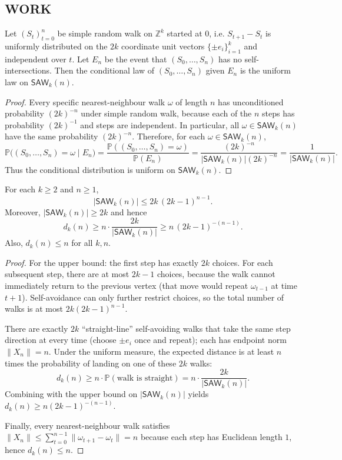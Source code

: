 \subsection*{WORK}
\begin{lemma}\label{lem:529-uniform}
Let $(S_t)_{t=0}^n$ be simple random walk on $\mathbb Z^k$ started at $0$, i.e. $S_{t+1}-S_t$ is uniformly distributed on the $2k$ coordinate unit vectors $\{\pm e_i\}_{i=1}^k$ and independent over $t$. Let $E_n$ be the event that $(S_0,\dots,S_n)$ has no self-intersections. Then the conditional law of $(S_0,\dots,S_n)$ given $E_n$ is the uniform law on $\mathsf{SAW}_k(n)$.
\end{lemma}
\begin{proof}
Every specific nearest-neighbour walk $\omega$ of length $n$ has unconditioned probability $(2k)^{-n}$ under simple random walk, because each of the $n$ steps has probability $(2k)^{-1}$ and steps are independent. In particular, all $\omega\in\mathsf{SAW}_k(n)$ have the same probability $(2k)^{-n}$. Therefore, for each $\omega\in\mathsf{SAW}_k(n)$,
\[
\mathbb P\big((S_0,\dots,S_n)=\omega\mid E_n\big)
=\frac{\mathbb P((S_0,\dots,S_n)=\omega)}{\mathbb P(E_n)}
=\frac{(2k)^{-n}}{|\mathsf{SAW}_k(n)|(2k)^{-n}}
=\frac1{|\mathsf{SAW}_k(n)|}.
\]
Thus the conditional distribution is uniform on $\mathsf{SAW}_k(n)$.
\end{proof}

\begin{lemma}\label{lem:529-count}
For each $k\ge 2$ and $n\ge 1$,
\[
|\mathsf{SAW}_k(n)| \le 2k\,(2k-1)^{n-1}.
\]
Moreover, $|\mathsf{SAW}_k(n)|\ge 2k$ and hence
\[
d_k(n)\ge n\cdot \frac{2k}{|\mathsf{SAW}_k(n)|}\ge n\,(2k-1)^{-(n-1)}.
\]
Also, $d_k(n)\le n$ for all $k,n$.
\end{lemma}
\begin{proof}
For the upper bound: the first step has exactly $2k$ choices. For each subsequent step, there are at most $2k-1$ choices, because the walk cannot immediately return to the previous vertex (that move would repeat $\omega_{t-1}$ at time $t+1$). Self-avoidance can only further restrict choices, so the total number of walks is at most $2k(2k-1)^{n-1}$.

There are exactly $2k$ ``straight-line'' self-avoiding walks that take the same step direction at every time (choose $\pm e_i$ once and repeat); each has endpoint norm $\|X_n\|=n$. Under the uniform measure, the expected distance is at least $n$ times the probability of landing on one of these $2k$ walks:
\[
d_k(n)\ge n\cdot \mathbb P(\text{walk is straight}) = n\cdot \frac{2k}{|\mathsf{SAW}_k(n)|}.
\]
Combining with the upper bound on $|\mathsf{SAW}_k(n)|$ yields $d_k(n)\ge n(2k-1)^{-(n-1)}$.

Finally, every nearest-neighbour walk satisfies $\|X_n\|\le \sum_{t=0}^{n-1}\|\omega_{t+1}-\omega_t\| = n$ because each step has Euclidean length $1$, hence $d_k(n)\le n$.
\end{proof}

